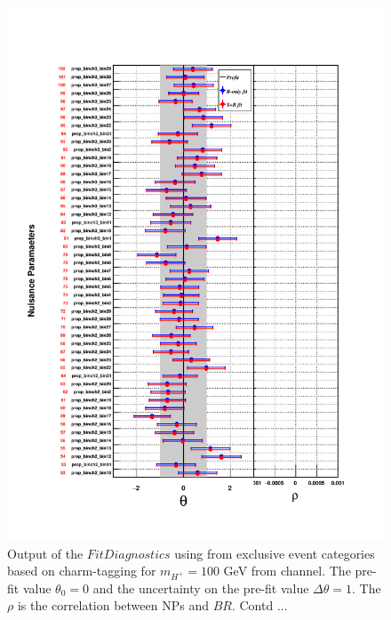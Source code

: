 \begin{figure}
\begin{center}
\includegraphics[width=1.0\textwidth]{Image/MLFit/FitDiag/fitDiag2.pdf}
 \caption{Output of the $FitDiagnostics$ using \mjj from
     exclusive event categories based on charm-tagging for $m_{H^+} = 100$
     GeV from \ljets channel. The pre-fit value $\theta_0 = 0$ and the uncertainty on the
     pre-fit value $\Delta\theta = 1$. The $\rho$ is the correlation between NPs and $BR$. Contd ...}
\label{fig:fitDiag2}
\end{center}
\end{figure}

